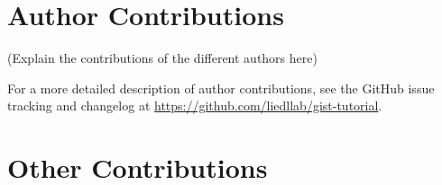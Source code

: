 \documentclass[9pt,tutorial]{livecoms}
\newcommand{\githubrepository}{\url{https://github.com/liedllab/gist-tutorial}}  %
\begin{document}
\begin{Checklists}[h]
%

\end{Checklists}








\section*{Author Contributions}
%

(Explain the contributions of the different authors here)

For a more detailed description of author contributions,
see the GitHub issue tracking and changelog at \githubrepository.

\section*{Other Contributions}
%
\end{document}
